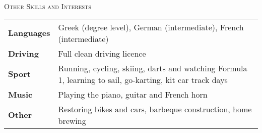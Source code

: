 \documentclass[a4paper,10pt]{article}
\newcommand{\header}[1]{{\hspace*{-17pt}\vspace*{6pt} \large{\textsc{#1}}}}
\begin{document}
\header{Other Skills and Interests}

\begin{tabular}{p{0.8in}p{5.3in}}
\textbf{Languages} & Greek (degree level), German (intermediate), French (intermediate)\\
\textbf{Driving} & Full clean driving licence \\
\textbf{Sport} & Running, cycling, skiing, darts and watching Formula 1, learning to sail, go-karting, kit car track days\\
\textbf{Music} & Playing the piano, guitar and French horn\\ 
\textbf{Other} & Restoring bikes and cars, barbeque construction, home brewing\\
\end{tabular}
\end{document}
